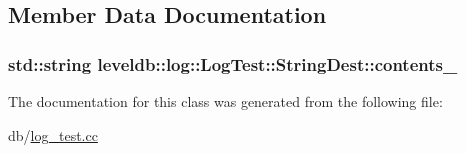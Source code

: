 \subsection{Member Data Documentation}
\hypertarget{classleveldb_1_1log_1_1_log_test_1_1_string_dest_a9a56f56d73ff14a617b2737c16e28bf4}{
\subsubsection[{contents\-\_\-}]{\setlength{\rightskip}{0pt plus 5cm}std\-::string leveldb\-::log\-::\-Log\-Test\-::\-String\-Dest\-::contents\-\_\-}}\label{classleveldb_1_1log_1_1_log_test_1_1_string_dest_a9a56f56d73ff14a617b2737c16e28bf4}


The documentation for this class was generated from the following file\-:\begin{DoxyCompactItemize}
\item 
db/\hyperlink{log__test_8cc}{log\-\_\-test.\-cc}\end{DoxyCompactItemize}
